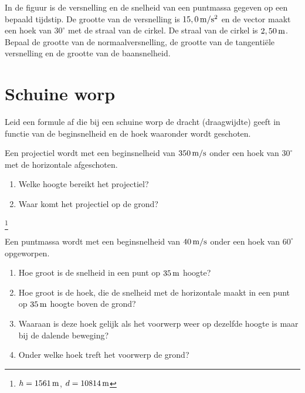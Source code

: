 \documentclass{ximera}
\begin{document}
\begin{exercise} In de figuur is de versnelling en de snelheid van een puntmassa gegeven op een bepaald tijdstip. De grootte van de versnelling is $15,0\rm\,m/s^2$ en de vector maakt een hoek van $30^\circ$ met de straal van de cirkel. De straal van de cirkel is $2,50\rm\,m$. Bepaal de grootte van de normaalversnelling, de grootte van de tangenti\"ele versnelling en de grootte van de baansnelheid.




\cleardoublepage

\section{Schuine worp}

\end{exercise}

\begin{exercise} Leid een formule af die bij een schuine worp de dracht
(draagwijdte) geeft in functie van de beginsnelheid en de hoek
waaronder wordt geschoten.

\end{exercise}

\begin{exercise} Een projectiel wordt met een beginsnelheid van $350\rm\,m/s$
onder een hoek van $30^\circ$ met de horizontale afgeschoten.
\begin{enumerate}
\item Welke hoogte bereikt het projectiel?
\item Waar komt het projectiel op de grond?
\end{enumerate}
\footnote{$h=1561\rm\,m$, $d=10814\rm\,m$}

\end{exercise}

\begin{exercise} Een puntmassa wordt met een beginsnelheid van $40\rm\,m/s$
onder een hoek van $60^{\circ}$ opgeworpen.
\begin{enumerate}
\item Hoe groot is de snelheid in een punt op $35\rm\,m$ hoogte?
\item Hoe groot is de hoek, die de snelheid met de horizontale maakt in een punt
op $35\rm\,m$ hoogte boven de grond?
\item Waaraan is deze hoek gelijk als het voorwerp weer op dezelfde
hoogte is maar bij de dalende beweging?
\item Onder welke hoek treft het voorwerp de grond?
\end{enumerate}

\end{exercise}
\end{document}
